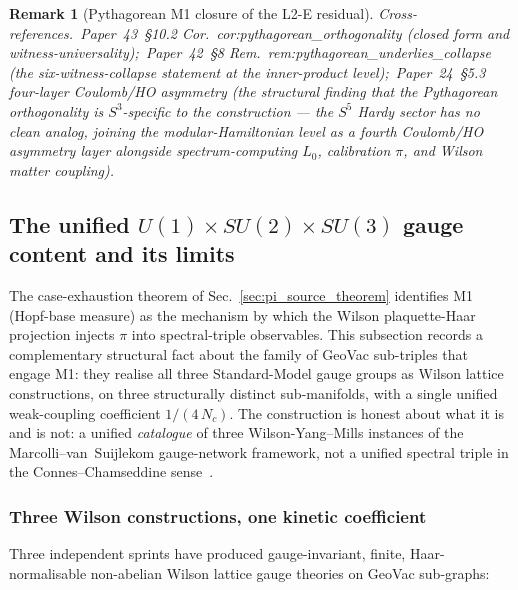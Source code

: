 \documentclass[11pt]{article}
\newtheorem{remark}{Remark}
\begin{document}
\begin{remark}[Pythagorean M1 closure of the L2-E residual]
\emph{Cross-references.}\ Paper~43~\S 10.2
Cor.~cor:pythagorean\_orthogonality (closed form and
witness-universality);\ Paper~42~\S 8
Rem.~rem:pythagorean\_underlies\_collapse (the
six-witness-collapse statement at the inner-product level);\
Paper~24~\S 5.3 four-layer Coulomb/HO asymmetry (the structural
finding that the Pythagorean orthogonality is $S^3$-specific to
the construction --- the $S^5$ Hardy sector has no clean analog,
joining the modular-Hamiltonian level as a fourth Coulomb/HO
asymmetry layer alongside spectrum-computing $L_0$, calibration
$\pi$, and Wilson matter coupling).
\end{remark}

\subsection{The unified $U(1) \times SU(2) \times SU(3)$ gauge
content and its limits}
\label{sec:unified_gauge}

The case-exhaustion theorem of Sec.~\ref{sec:pi_source_theorem}
identifies M1 (Hopf-base measure) as the mechanism by which the
Wilson plaquette-Haar projection injects $\pi$ into spectral-triple
observables.  This subsection records a complementary structural
fact about the family of GeoVac sub-triples that engage M1: they
realise all three Standard-Model gauge groups as Wilson lattice
constructions, on three structurally distinct sub-manifolds, with a
single unified weak-coupling coefficient $1/(4\,N_c)$.  The
construction is honest about what it is and is not: a unified
\emph{catalogue} of three Wilson-Yang--Mills instances of the
Marcolli--van~Suijlekom gauge-network framework, not a unified
spectral triple in the Connes--Chamseddine
sense~\cite{chamseddine_connes2010}.

\subsubsection*{Three Wilson constructions, one kinetic coefficient}

Three independent sprints have produced gauge-invariant, finite,
Haar-normalisable non-abelian Wilson lattice gauge theories on
GeoVac sub-graphs:
\end{document}
